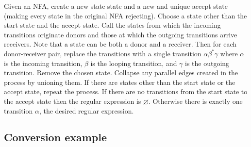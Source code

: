 \documentclass{notes}
\begin{document}
\begin{prf}
  Given an NFA, create a new state state and a new and unique accept state (making every state in the original NFA rejecting).
  Choose a state other than the start state and the accept state.
  Call the states from which the incoming transitions originate donors and those at which the outgoing transitions arrive receivers.
  Note that a state can be both a donor and a receiver.
  Then for each donor-receiver pair, replace the transitions with a single transition $\alpha \beta^* \gamma$ where $\alpha$ is the incoming transition, $\beta$ is the looping transition, and $\gamma$ is the outgoing transition.
  Remove the chosen state.
  Collapse any parallel edges created in the process by unioning them.
  If there are states other than the start state or the accept state, repeat the process.
  If there are no transitions from the start state to the accept state then the regular expression is $\varnothing$.
  Otherwise there is exactly one transition $\alpha$, the desired regular expression.
\end{prf}

\subsection{Conversion example}

\begin{center}
\end{center}
\end{document}
